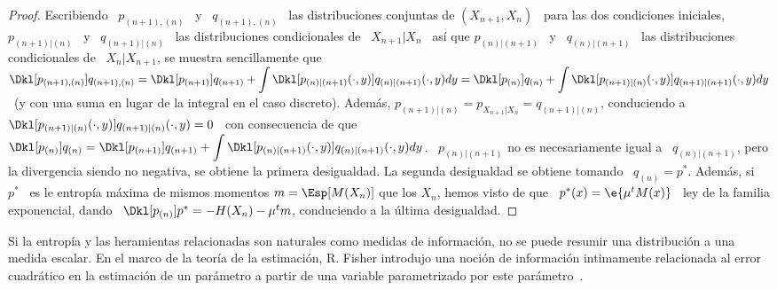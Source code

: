 \begin{proof}
  Escribiendo  \ $p_{(n+1),(n)}$  \  y \  $q_{(n+1),(n)}$  \ las  distribuciones
  conjuntas  de  $(X_{n+1},X_n)$  \   para  las  dos  condiciones  iniciales,  \
  $p_{(n+1)|(n)}$ \ y \ $q_{(n+1)|(n)}$  \ las distribuciones condicionales de \
  $X_{n+1}|X_n$  \  as\'i  que  $p_{(n)|(n+1)}$  \ y  \  $q_{(n)|(n+1)}$  \  las
  distribuciones condicionales de \  $X_n|X_{n+1}$, se muestra sencillamente que
  \          $\displaystyle         \Dkl[p_{(n+1),(n)}]{q_{(n+1),(n)}}         =
  \Dkl[p_{(n+1)}]{q_{(n+1)}}                        +                       \int
  \Dkl[p_{(n)|(n+1)}(\cdot,y)]{q_{(n)|(n+1)}(\cdot,y)}            dy           =
  \Dkl[p_{(n)}]{q_{(n)}}                          +                         \int
  \Dkl[p_{(n+1)|(n)}(\cdot,y)]{q_{(n+1)|(n+1)}(\cdot,y)} dy$  \ (y con  una suma
  en  lugar de la  integral en  el caso  discreto).  Adem\'as,  $p_{(n+1)|(n)} =
  p_{X_{n+1}|X_n}         =         q_{(n+1)|(n)}$,        conduciendo         a
  $\Dkl[p_{(n+1)|(n)}(\cdot,y)]{q_{(n+1)|(n)}(\cdot,y)} =  0$ \ con consecuencia
  de que \  $\displaystyle \Dkl[p_{(n)}]{q_{(n)}} = \Dkl[p_{(n+1)}]{q_{(n+1)}} +
  \int      \Dkl[p_{(n)|(n+1)}(\cdot,y)]{q_{(n)|(n+1)}(\cdot,y)}     dy$.      \
  $p_{(n)|(n+1)}$  no  es necesariamente  igual  a  \  $q_{(n)|(n+1)}$, pero  la
  divergencia siendo no negativa, se obtiene la primera desigualdad.  La segunda
  desigualdad se obtiene  tomando \ $q_{(n)} = p^*$.  Adem\'as, si  \ $p^*$ \ es
  le entrop\'ia  m\'axima de mismos momentos  $m = \Esp[M(X_n)]$  que los $X_n$,
  hemos  visto  de  que  \  $p^*(x)  =  \e{\mu^t M(x)}$  \  ley  de  la  familia
  exponencial, dando \  $\Dkl[p_{(n)}]{p^*} = -H(X_n) - \mu^t  m$, conduciendo a
  la \'ultima desigualdad.
\end{proof}







Si la  entrop\'ia y las heramientas  relacionadas son naturales  como medidas de
informaci\'on, no se  puede resumir una distribuci\'on a  una medida escalar. En
el marco de la teor\'ia de  la estimaci\'on, R. Fisher introdujo una noci\'on de
informaci\'on intimamente  relacionada al error cuadr\'atico  en la estimaci\'on
de   un  par\'ametro   a  partir   de  una   variable  parametrizado   por  este
par\'ametro~\cite{Fis22, Fis25:07, Kay93, Bos07, CovTho06, Fri04}.

